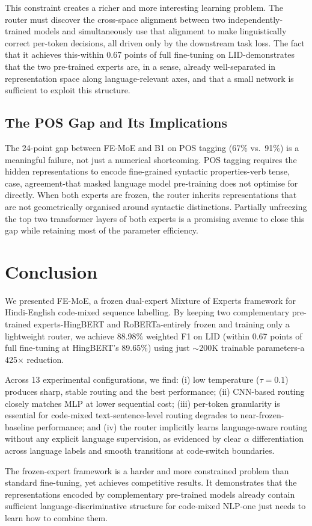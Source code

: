 \documentclass[conference]{IEEEtran}
\begin{document}
This constraint creates a richer and more interesting learning problem. The router must discover the cross-space alignment between two independently-trained models and simultaneously use that alignment to make linguistically correct per-token decisions, all driven only by the downstream task loss. The fact that it achieves this-within 0.67 points of full fine-tuning on LID-demonstrates that the two pre-trained experts are, in a sense, already well-separated in representation space along language-relevant axes, and that a small network is sufficient to exploit this structure.

\subsection{The POS Gap and Its Implications}

The 24-point gap between FE-MoE and B1 on POS tagging (67\% vs.\ 91\%) is a meaningful failure, not just a numerical shortcoming. POS tagging requires the hidden representations to encode fine-grained syntactic properties-verb tense, case, agreement-that masked language model pre-training does not optimise for directly. When both experts are frozen, the router inherits representations that are not geometrically organised around syntactic distinctions. Partially unfreezing the top two transformer layers of both experts is a promising avenue to close this gap while retaining most of the parameter efficiency.

\section{Conclusion}

We presented FE-MoE, a frozen dual-expert Mixture of Experts framework for Hindi-English code-mixed sequence labelling. By keeping two complementary pre-trained experts-HingBERT and RoBERTa-entirely frozen and training only a lightweight router, we achieve 88.98\% weighted F1 on LID (within 0.67 points of full fine-tuning at HingBERT's 89.65\%) using just $\sim$200K trainable parameters-a 425$\times$ reduction.

Across 13 experimental configurations, we find: (i) low temperature ($\tau{=}0.1$) produces sharp, stable routing and the best performance; (ii) CNN-based routing closely matches MLP at lower sequential cost; (iii) per-token granularity is essential for code-mixed text-sentence-level routing degrades to near-frozen-baseline performance; and (iv) the router implicitly learns language-aware routing without any explicit language supervision, as evidenced by clear $\alpha$ differentiation across language labels and smooth transitions at code-switch boundaries.

The frozen-expert framework is a harder and more constrained problem than standard fine-tuning, yet achieves competitive results. It demonstrates that the representations encoded by complementary pre-trained models already contain sufficient language-discriminative structure for code-mixed NLP-one just needs to learn how to combine them.



\end{document}
